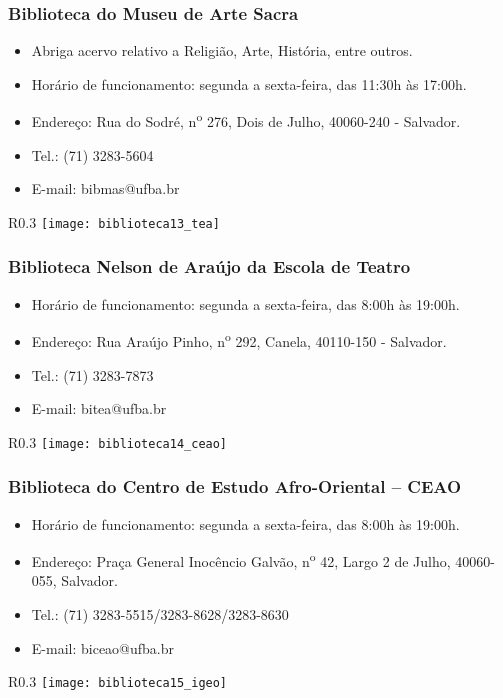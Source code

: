     \subsubsection{Biblioteca do Museu de Arte Sacra}
        \begin{itemize}
            \item Abriga acervo relativo a Religião, Arte, História, entre outros.
            \item Horário de funcionamento: segunda a sexta-feira, das 11:30h às 17:00h.
            \item Endereço: Rua do Sodré, n\textsuperscript{o} 276, Dois de Julho, 40060-240 - Salvador.
            \item Tel.: (71) 3283-5604
            \item E-mail: bibmas@ufba.br
        \end{itemize}
        \begin{wrapfigure}{R}{0.3\textwidth}
            \centering
            \texttt{[image: biblioteca13\_tea]}
        \end{wrapfigure}
    \subsubsection{Biblioteca Nelson de Araújo da Escola de Teatro}
        \begin{itemize}
            \item Horário de funcionamento: segunda a sexta-feira, das 8:00h às 19:00h.
            \item Endereço: Rua Araújo Pinho, n\textsuperscript{o} 292, Canela, 40110-150 - Salvador.
            \item Tel.: (71) 3283-7873
            \item E-mail: bitea@ufba.br
        \end{itemize}
        \begin{wrapfigure}{R}{0.3\textwidth}
            \centering
            \texttt{[image: biblioteca14\_ceao]}
        \end{wrapfigure}
   
    \subsubsection{Biblioteca do Centro de Estudo Afro-Oriental – CEAO}
        \begin{itemize}
            \item Horário de funcionamento: segunda a sexta-feira, das 8:00h às 19:00h.
            \item Endereço: Praça General Inocêncio Galvão, n\textsuperscript{o} 42, Largo 2 de Julho, 40060-055, Salvador.
            \item Tel.: (71) 3283-5515/3283-8628/3283-8630
            \item E-mail: biceao@ufba.br
        \end{itemize}
        \begin{wrapfigure}{R}{0.3\textwidth}
            \centering
            \texttt{[image: biblioteca15\_igeo]}
        \end{wrapfigure}
